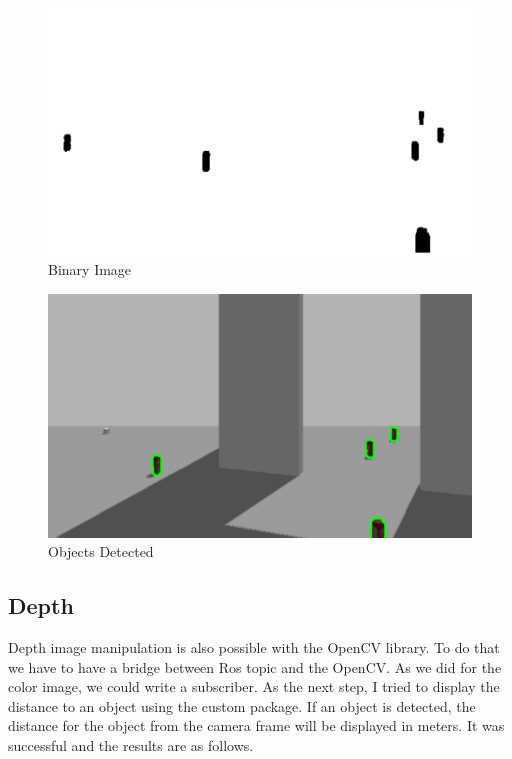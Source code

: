 \documentclass[twoside,12pt,times,onecolumn,a4paper]{report}
\begin{document}
\begin{figure}[!h]
  \centering
   \includegraphics[width=15cm]{binary}
  \caption{Binary Image}
\end{figure}

\begin{figure}[!h]
  \centering
   \includegraphics[width=15cm]{detected}
  \caption{Objects Detected}
\end{figure}

\subsection{Depth}

Depth image manipulation is also possible with the OpenCV library. To do 
that we have to have a bridge between Ros topic and the OpenCV. As we did for the 
color image, we could write a subscriber. As the next step, I tried to display the 
distance to an object using the custom package. If an object is detected, the 
distance for the object from the camera frame will be displayed in meters. It was 
successful and the results are as follows.
\end{document}
